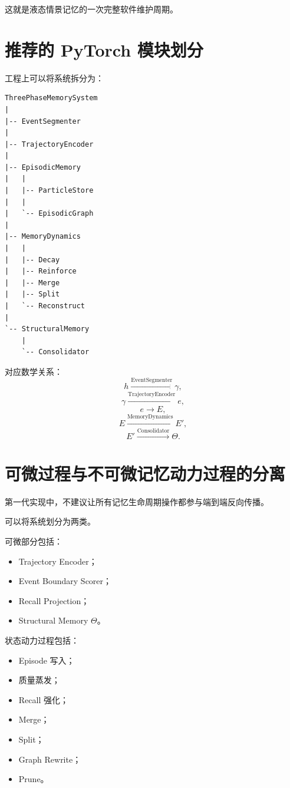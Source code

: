 这就是液态情景记忆的一次完整软件维护周期。

\section{推荐的 PyTorch 模块划分}

工程上可以将系统拆分为：

\begin{verbatim}
ThreePhaseMemorySystem
|
|-- EventSegmenter
|
|-- TrajectoryEncoder
|
|-- EpisodicMemory
|   |
|   |-- ParticleStore
|   |
|   `-- EpisodicGraph
|
|-- MemoryDynamics
|   |
|   |-- Decay
|   |-- Reinforce
|   |-- Merge
|   |-- Split
|   `-- Reconstruct
|
`-- StructuralMemory
    |
    `-- Consolidator
\end{verbatim}

对应数学关系：
\[
h
\xrightarrow{
\mathrm{EventSegmenter}
}
\gamma,
\]
\[
\gamma
\xrightarrow{
\mathrm{TrajectoryEncoder}
}
e,
\]
\[
e
\rightarrow
E,
\]
\[
E
\xrightarrow{
\mathrm{MemoryDynamics}
}
E',
\]
\[
E'
\xrightarrow{
\mathrm{Consolidator}
}
\Theta.
\]

\section{可微过程与不可微记忆动力过程的分离}

第一代实现中，不建议让所有记忆生命周期操作都参与端到端反向传播。

可以将系统划分为两类。

可微部分包括：

\begin{itemize}
    \item Trajectory Encoder；
    \item Event Boundary Scorer；
    \item Recall Projection；
    \item Structural Memory $\Theta$。
\end{itemize}

状态动力过程包括：

\begin{itemize}
    \item Episode 写入；
    \item 质量蒸发；
    \item Recall 强化；
    \item Merge；
    \item Split；
    \item Graph Rewrite；
    \item Prune。
\end{itemize}


